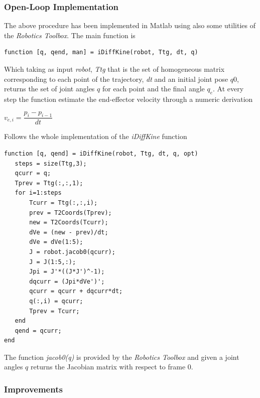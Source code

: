\subsubsection{Open-Loop Implementation}
\label{sssec:olimp}
The above procedure has been implemented in Matlab using also some utilities of the \textit{Robotics Toolbox}.
The main function is
\begin{lstlisting}
function [q, qend, man] = iDiffKine(robot, Ttg, dt, q)
\end{lstlisting}
Which taking as input \textit{robot}, \textit{Ttg} that is the set of homogeneous matrix corresponding to each point of the trajectory, \textit{dt} and an initial joint pose $q0$, returns the set of joint angles $q$ for each point and the final angle $q_e$. At every step the function estimate the end-effector velocity through a numeric derivation
\begin{center}
$	v_{e,i} = \dfrac{p_i - p_{i-1}}{dt}$
\end{center}
Follows the whole implementation of the \textit{iDiffKine} function
\begin{lstlisting}
function [q, qend] = iDiffKine(robot, Ttg, dt, q, opt)
   steps = size(Ttg,3);
   qcurr = q;
   Tprev = Ttg(:,:,1);
   for i=1:steps
       Tcurr = Ttg(:,:,i);
       prev = T2Coords(Tprev);
       new = T2Coords(Tcurr);
       dVe = (new - prev)/dt;
       dVe = dVe(1:5);
       J = robot.jacob0(qcurr);
       J = J(1:5,:);
       Jpi = J'*((J*J')^-1);
       dqcurr = (Jpi*dVe')'; 
       qcurr = qcurr + dqcurr*dt;
       q(:,i) = qcurr;
       Tprev = Tcurr;
   end
   qend = qcurr;
end   
\end{lstlisting}
The function \textit{jacob0(q)} is provided by the \textit{Robotics Toolbox} and given a joint angles $q$ returns the Jacobian matrix with respect to frame 0.

\subsubsection{Improvements}
\label{sssec:ikcon}

